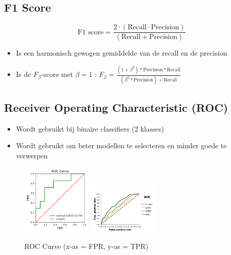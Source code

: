 \documentclass{article}
\begin{document}
\subsection{F1 Score}

\begin{equation}
    \text{F1 score} = \frac{2\cdot(\text{Recall} \cdot \text{Precision})}{(\text{Recall} + \text{Precision})}
\end{equation}

\begin{itemize}
    \item Is een harmonisch gewogen gemiddelde van de recall en de precision
    \item Is de $F_\beta$-score met $\beta = 1$ : $F_{\beta} = \frac{(1+\beta^2)*\text{Precision}*\text{Recall}}{(\beta^2 * \text{Precision}) + \text{Recall}}$
\end{itemize}

\subsection{Receiver Operating Characteristic (ROC)}

\begin{itemize}
    \item Wordt gebruikt bij binaire classifiers (2 klasses)
    \item Wordt gebruikt om beter modellen te selecteren en minder goede te verwerpen
\end{itemize}

\begin{figure}[H]
    \centering
    \includegraphics[width=0.3\textwidth]{roc.png}
    \includegraphics[width=0.3\textwidth]{roc2.png}
    \caption{ROC Curve (x-as = FPR, y-as = TPR)}
\end{figure}
\end{document}
